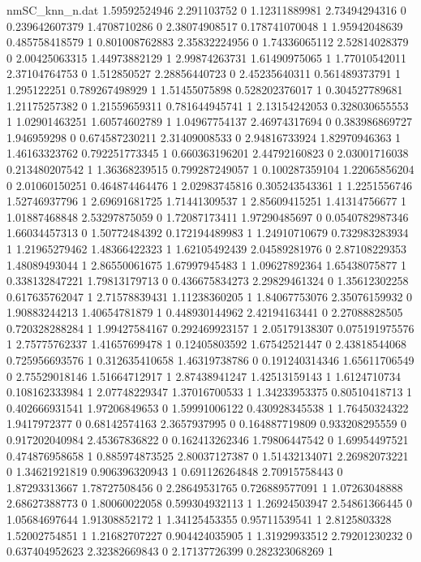 \begin{filecontents}{nmSC_knn_n.dat}
1.59592524946 2.291103752 0
1.12311889981 2.73494294316 0
0.239642607379 1.4708710286 0
2.38074908517 0.178741070048 1
1.95942048639 0.485758418579 1
0.801008762883 2.35832224956 0
1.74336065112 2.52814028379 0
2.00425063315 1.44973882129 1
2.99874263731 1.61490975065 1
1.77010542011 2.37104764753 0
1.512850527 2.28856440723 0
2.45235640311 0.561489373791 1
1.295122251 0.789267498929 1
1.51455075898 0.528202376017 1
0.304527789681 1.21175257382 0
1.21559659311 0.781644945741 1
2.13154242053 0.328030655553 1
1.02901463251 1.60574602789 1
1.04967754137 2.46974317694 0
0.383986869727 1.946959298 0
0.674587230211 2.31409008533 0
2.94816733924 1.82970946363 1
1.46163323762 0.792251773345 1
0.660363196201 2.44792160823 0
2.03001716038 0.213480207542 1
1.36368239515 0.799287249057 1
0.100287359104 1.22065856204 0
2.01060150251 0.464874464476 1
2.02983745816 0.305243543361 1
1.2251556746 1.52746937796 1
2.69691681725 1.71441309537 1
2.85609415251 1.41314756677 1
1.01887468848 2.53297875059 0
1.72087173411 1.97290485697 0
0.0540782987346 1.66034457313 0
1.50772484392 0.172194489983 1
1.24910710679 0.732983283934 1
1.21965279462 1.48366422323 1
1.62105492439 2.04589281976 0
2.87108229353 1.48089493044 1
2.86550061675 1.67997945483 1
1.09627892364 1.65438075877 1
0.338132847221 1.79813179713 0
0.436675834273 2.29829461324 0
1.35612302258 0.617635762047 1
2.71578839431 1.11238360205 1
1.84067753076 2.35076159932 0
1.90883244213 1.40654781879 1
0.448930144962 2.42194163441 0
2.27088828505 0.720328288284 1
1.99427584167 0.292469923157 1
2.05179138307 0.075191975576 1
2.75775762337 1.41657699478 1
0.12405803592 1.67542521447 0
2.43818544068 0.725956693576 1
0.312635410658 1.46319738786 0
0.191240314346 1.65611706549 0
2.75529018146 1.51664712917 1
2.87438941247 1.42513159143 1
1.6124710734 0.108162333984 1
2.07748229347 1.37016700533 1
1.34233953375 0.80510418713 1
0.402666931541 1.97206849653 0
1.59991006122 0.430928345538 1
1.76450324322 1.9417972377 0
0.68142574163 2.3657937995 0
0.164887719809 0.933208295559 0
0.917202040984 2.45367836822 0
0.162413262346 1.79806447542 0
1.69954497521 0.474876958658 1
0.885974873525 2.80037127387 0
1.51432134071 2.26982073221 0
1.34621921819 0.906396320943 1
0.691126264848 2.70915758443 0
1.87293313667 1.78727508456 0
2.28649531765 0.726889577091 1
1.07263048888 2.68627388773 0
1.80060022058 0.599304932113 1
1.26924503947 2.54861366445 0
1.05684697644 1.91308852172 1
1.34125453355 0.95711539541 1
2.8125803328 1.52002754851 1
1.21682707227 0.904424035905 1
1.31929933512 2.79201230232 0
0.637404952623 2.32382669843 0
2.17137726399 0.282323068269 1

\end{filecontents}
